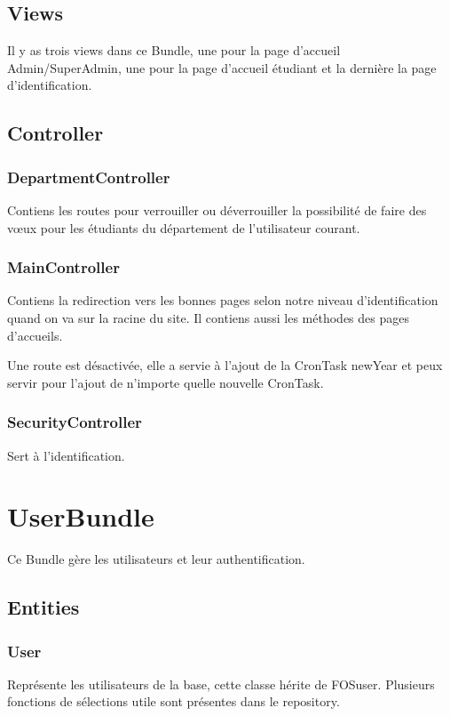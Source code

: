 \subsection{Views}
Il y as trois views dans ce Bundle, une pour la page d'accueil Admin/SuperAdmin, une pour la page d'accueil étudiant et la dernière la page d'identification.

\subsection{Controller}
\subsubsection{DepartmentController}
Contiens les routes pour verrouiller ou déverrouiller la possibilité de faire des vœux pour les étudiants du département de l'utilisateur courant.

\subsubsection{MainController}
Contiens la redirection vers les bonnes pages selon notre niveau d'identification quand on va sur la racine du site.
Il contiens aussi les méthodes des pages d'accueils.

Une route est désactivée, elle a servie à l'ajout de la CronTask newYear et peux servir pour l'ajout de n'importe quelle nouvelle CronTask.

\subsubsection{SecurityController}
Sert à l'identification.

\section{UserBundle}
Ce Bundle gère les utilisateurs et leur authentification.

\subsection{Entities}
\subsubsection{User}
Représente les utilisateurs de la base, cette classe hérite de FOSuser. Plusieurs fonctions de sélections utile sont présentes dans le repository.

